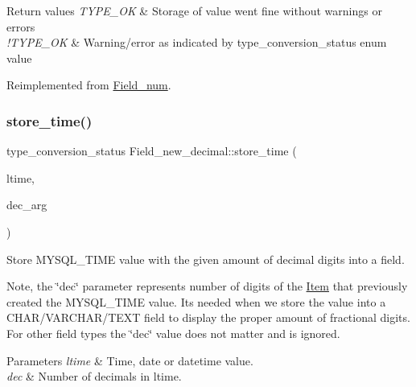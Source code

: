 \begin{DoxyRetVals}{Return values}
{\em T\+Y\+P\+E\+\_\+\+OK} & Storage of value went fine without warnings or errors \\
\hline
{\em !\+T\+Y\+P\+E\+\_\+\+OK} & Warning/error as indicated by type\+\_\+conversion\+\_\+status enum value \\
\hline
\end{DoxyRetVals}


Reimplemented from \mbox{\hyperlink{classField__num_a66573c9ffc227799320c49a73a0f8de5}{Field\+\_\+num}}.

\mbox{\label{classField__new__decimal_ab6f4b13ae308695dffd15cb0c39038d0}} 
\subsubsection{\texorpdfstring{store\+\_\+time()}{store\_time()}}
{\footnotesize\ttfamily type\+\_\+conversion\+\_\+status Field\+\_\+new\+\_\+decimal\+::store\+\_\+time (\begin{DoxyParamCaption}\item[{M\+Y\+S\+Q\+L\+\_\+\+T\+I\+ME $\ast$}]{ltime,  }\item[{uint8}]{dec\+\_\+arg }\end{DoxyParamCaption})\hspace{0.3cm}{\ttfamily [virtual]}}

Store M\+Y\+S\+Q\+L\+\_\+\+T\+I\+ME value with the given amount of decimal digits into a field.

Note, the \char`\"{}dec\char`\"{} parameter represents number of digits of the \mbox{\hyperlink{classItem}{Item}} that previously created the M\+Y\+S\+Q\+L\+\_\+\+T\+I\+ME value. It\textquotesingle{}s needed when we store the value into a C\+H\+A\+R/\+V\+A\+R\+C\+H\+A\+R/\+T\+E\+XT field to display the proper amount of fractional digits. For other field types the \char`\"{}dec\char`\"{} value does not matter and is ignored.


\begin{DoxyParams}{Parameters}
{\em ltime} & Time, date or datetime value. \\
\hline
{\em dec} & Number of decimals in ltime. \\
\hline
\end{DoxyParams}

